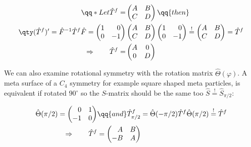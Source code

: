 \begin{equation}
\begin{aligned}
    \qq*{Let} \hat T^f =
    &\begin{pmatrix}
        A & B \\
        C & D
    \end{pmatrix}
    \qq{then} \\
    \qty(\hat T^f)' =
    \hat F^{-1} \hat T^f \hat F =
    \begin{pmatrix}
        1 & \phantom{-} 0 \\
        0 & -           1
    \end{pmatrix}
    &\begin{pmatrix}
        A & B \\
        C & D
    \end{pmatrix}
    \begin{pmatrix}
        1 & \phantom{-} 0 \\
        0 & -           1
    \end{pmatrix}
    \stackrel{!}{=}
    \begin{pmatrix}
        A & B \\
        C & D
    \end{pmatrix} =
    \hat T^f \\
    \Rightarrow \qquad
    \hat T^f =
    &\begin{pmatrix}
        A & 0 \\
        0 & D
    \end{pmatrix}
\end{aligned}
\end{equation}

We can also examine rotational symmetry with the rotation matrix $\hat \Theta(\varphi)$. A meta surface of a $C_4$ symmetry for example square shaped meta particles, is equivalent if rotated $90^\circ$ so the $S$-matrix should be the same too
$\hat S \stackrel{!}{=} \hat S_{\pi/2}$:

\begin{equation}
\begin{aligned}
    \hat \Theta(\pi/2) =
    \begin{pmatrix}
        \phantom{-} 0 & 1 \\
        -1 & 0
    \end{pmatrix}
    &\qq{and}
    \hat T^f_{\pi/2} =
    \hat \Theta(-\pi/2) \hat T^f \hat \Theta(\pi/2)
    \stackrel{!}{=}
    \hat T^f\\
    \Rightarrow \qquad
    \hat T^f &=
    \begin{pmatrix}
        \phantom{-} A & B \\
        -           B & A
    \end{pmatrix}
\end{aligned}
\end{equation}

